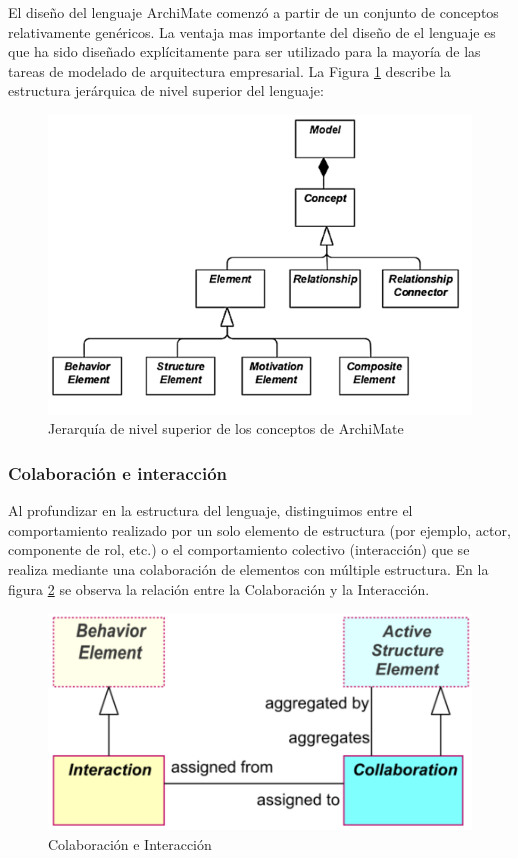 El diseño del lenguaje ArchiMate comenzó a partir de un conjunto de conceptos relativamente genéricos. 
La ventaja mas importante del diseño de el lenguaje es que ha sido diseñado explícitamente para ser utilizado para la mayoría de las tareas de modelado de arquitectura empresarial. La Figura \ref{altonivel} describe la estructura jerárquica de nivel superior del lenguaje:
\begin{figure}[h!]
	\centering
	\includegraphics[width=1\linewidth]{ARQUITECTURA/imgs/altonivel}
	\caption{Jerarquía de nivel superior de los conceptos de ArchiMate}
	\label{altonivel}
\end{figure}

\newpage
\subsubsection{Colaboración e interacción}
Al profundizar en la estructura del lenguaje, distinguimos entre el comportamiento realizado por un solo elemento de estructura (por ejemplo, actor, componente de rol, etc.) o el comportamiento colectivo (interacción) que se realiza mediante una colaboración de elementos con múltiple estructura. En la figura \ref{comportamiento} se observa la relación entre la Colaboración y la Interacción.

\begin{figure}[h!]
	\centering
	\includegraphics[width=0.9\linewidth]{ARQUITECTURA/imgs/comportamiento}
	\caption{Colaboración e Interacción}
	\label{comportamiento}
\end{figure}

